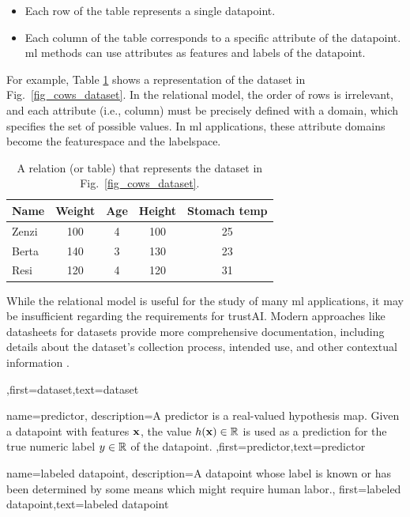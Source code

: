 {{\begin{itemize}
		\item Each row of the table represents a single \gls{datapoint}.
		\item Each column of the table corresponds to a specific attribute of the \gls{datapoint}. 
		\gls{ml} methods can use attributes as \gls{feature}s and \gls{label}s of the \gls{datapoint}.
		\end{itemize}
		For example, Table \ref{tab:cowdata} shows a representation of the dataset in Fig.\ \ref{fig_cows_dataset}. 
		In the relational \gls{model}, the order of rows is irrelevant, and each attribute (i.e., column) must be 
		precisely defined with a domain, which specifies the set of possible values. In \gls{ml} applications, 
		these attribute domains become the \gls{featurespace} and the \gls{labelspace}.
		\begin{table}[H]
			\centering
			\begin{tabular}{lcccc}
				\hline
				\textbf{Name} & \textbf{Weight} & \textbf{Age} & \textbf{Height} & \textbf{Stomach temp} \\
				\hline
				Zenzi & 100 & 4 & 100 & 25 \\
				Berta & 140 & 3 & 130 & 23 \\
				Resi  & 120 & 4 & 120 & 31 \\
				\hline
			\end{tabular}
			\caption{A relation (or table) that represents the dataset in Fig.\ \ref{fig_cows_dataset}.}
			\label{tab:cowdata}
		\end{table}
 While the relational \gls{model} is useful for the study of many \gls{ml} applications, it may be 
 insufficient regarding the requirements for \gls{trustAI}. Modern 
 approaches like datasheets for datasets provide more comprehensive 
 documentation, including details about the dataset’s collection process, intended 
 use, and other contextual information \cite{DatasheetData2021}.},first={dataset},text={dataset}  
}

{name={predictor},
	description={A predictor is a real-valued \gls{hypothesis} map. 
		Given a \gls{datapoint} with \gls{feature}s ${\bf x}$, the value 
		$h({\bf x}) \in \mathbb{R}$ is used as a \gls{prediction} for the true 
		numeric \gls{label} $y \in \mathbb{R}$ of the \gls{datapoint}. },first={predictor},text={predictor}  
}

{name={labeled datapoint},
 description={A \gls{datapoint} whose \gls{label} is known or has been determined 
 	by some means which might require human labor.},
 first={labeled datapoint},text={labeled datapoint}  
}

